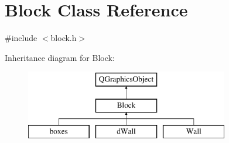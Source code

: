 \hypertarget{class_block}{\section{Block Class Reference}
\label{class_block}
}


{\ttfamily \#include $<$block.\-h$>$}

Inheritance diagram for Block\-:\begin{figure}[H]
\begin{center}
\leavevmode
\includegraphics[height=3.000000cm]{class_block}
\end{center}
\end{figure}
